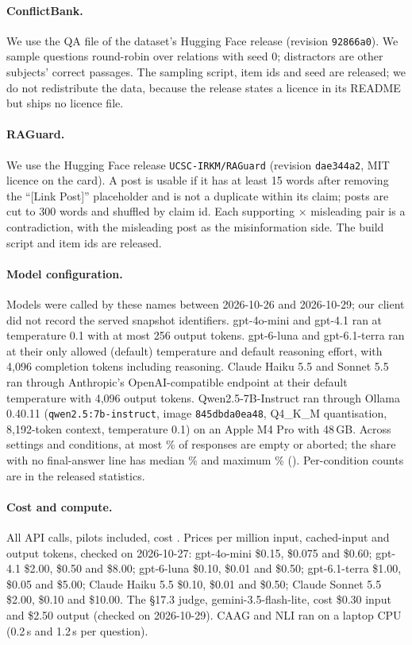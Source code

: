 \paragraph{ConflictBank.} We use the QA file of the dataset's Hugging Face release (revision \texttt{92866a0}). We sample questions round-robin over relations with seed 0; distractors are other subjects' correct passages. The
sampling script, item ids and seed are released; we do not redistribute the data, because the release states
a licence in its README but ships no licence file.

\paragraph{RAGuard.} We use the Hugging Face release \texttt{UCSC-IRKM/RAGuard} (revision \texttt{dae344a2}, MIT
licence on the card). A post is usable if it has at least 15 words after removing the ``[Link Post]'' placeholder and is
not a duplicate within its claim; posts are cut to 300 words and shuffled by claim id. Each supporting $\times$ misleading
pair is a contradiction, with the misleading post as the misinformation side. The build script and item ids are
released.

\paragraph{Model configuration.} Models were called by these names between 2026-10-26 and 2026-10-29;
our client did not record the served snapshot identifiers. gpt-4o-mini and gpt-4.1 ran at temperature 0.1
with at most 256 output tokens. gpt-6-luna and gpt-6.1-terra ran at their only allowed (default) temperature and default
reasoning effort, with 4,096 completion tokens including reasoning. Claude Haiku 5.5 and Sonnet 5.5 ran through
Anthropic's OpenAI-compatible endpoint at their default temperature with 4,096 output tokens. Qwen2.5-7B-Instruct ran
through Ollama 0.40.11 (\texttt{qwen2.5:7b-instruct}, image \texttt{845dbda0ea48}, Q4\_K\_M quantisation, 8,192-token
context, temperature 0.1) on an Apple M4 Pro with 48\,GB. Across settings and conditions, at most \truncMaxEmpty\% of
responses are empty or aborted; the share with no final-answer line has median \truncMedNoFinal\% and maximum
\truncMaxNoFinal\% (\truncMaxAt). Per-condition counts are in the released statistics.

\paragraph{Cost and compute.} All API calls, pilots included, cost \totalSpend. Prices per million input, cached-input and output tokens, checked on 2026-10-27: gpt-4o-mini \$0.15, \$0.075 and \$0.60; gpt-4.1 \$2.00, \$0.50 and \$8.00; gpt-6-luna \$0.10, \$0.01 and \$0.50; gpt-6.1-terra \$1.00, \$0.05 and \$5.00; Claude Haiku 5.5 \$0.10, \$0.01 and
\$0.50; Claude Sonnet 5.5 \$2.00, \$0.10 and \$10.00. The \S17.3 judge, gemini-3.5-flash-lite, cost \$0.30 input and \$2.50 output (checked on 2026-10-29). CAAG and NLI ran on a
laptop CPU (0.2\,s and 1.2\,s per question).
